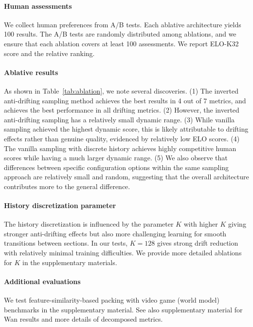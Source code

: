 \documentclass{article}
\begin{document}
\paragraph{Human assessments}

We collect human preferences from A/B tests. Each ablative architecture yields 100 results. The A/B tests are randomly distributed among ablations, and we ensure that each ablation covers at least 100 assessments. We report ELO-K32 score and the relative ranking.

\paragraph{Ablative results}

As shown in Table~\ref{tab:ablation}, we note several discoveries.
(1) The inverted anti-drifting sampling method achieves the best results in 4 out of 7 metrics, and achieves the best performance in all drifting metrics. 
(2) However, the inverted anti-drifting sampling has a relatively small dynamic range.
(3) While vanilla sampling achieved the highest dynamic score, this is likely attributable to drifting effects rather than genuine quality, evidenced by relatively low ELO scores.
(4) The vanilla sampling with discrete history achieves highly competitive human scores while having a much larger dynamic range.
(5) We also observe that differences between specific configuration options within the same sampling approach are relatively small and random, suggesting that the overall architecture contributes more to the general difference.

\paragraph{History discretization parameter} 
The history discretization is influenced by the parameter $K$ with higher $K$ giving stronger anti-drifting effects but also more challenging learning for smooth transitions between sections. In our tests, $K=128$ gives strong drift reduction with relatively minimal training difficulties. We provide more detailed ablations for $K$ in the supplementary materials.

\paragraph{Additional evaluations}

We test feature-similarity-based packing with video game (world model) benchmarks in the supplementary material. See also supplementary material for Wan results and more details of decomposed metrics.
\end{document}
